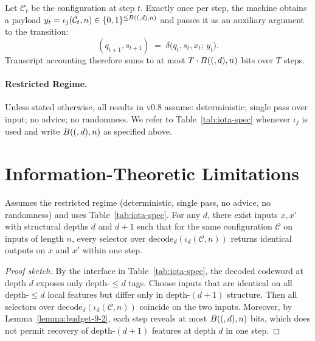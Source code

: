   \begin{definition}\label{def:iota-injection}
  Let $\mathcal{C}_t$ be the configuration at step $t$. Exactly once per step, the machine obtains a payload $y_t = \iota_j(\mathcal{C}_t, n) \in \{0,1\}^{\le B((,d),n)}$ and passes it as an auxiliary argument to the transition:
  \[
  (q_{t+1}, s_{t+1}) \;=\; \delta\bigl(q_t, s_t, x_t;\, y_t\bigr).
  \]
  Transcript accounting therefore sums to at most $T \cdot B((,d),n)$ bits over $T$ steps.
  \end{definition}
  
  
  \paragraph{Restricted Regime.}
  Unless stated otherwise, all results in v0.8 assume: deterministic; single pass over input; no advice; no randomness.
  We refer to Table~\ref{tab:iota-spec} whenever $\iota_j$ is used and write $B((,d),n)$ as specified above.
  
  \section{Information-Theoretic Limitations}
  
  \begin{lemma}
  \label{lemma:selector-indist}
  Assumes the restricted regime (deterministic, single pass, no advice, no randomness) and uses Table~\ref{tab:iota-spec}.
  For any $d$, there exist inputs $x,x'$ with structural depths $d$ and $d{+}1$ such that for the same configuration $\mathcal{C}$ on inputs of length $n$, every selector over $\mathrm{decode}_d(\iota_d(\mathcal{C},n))$ returns identical outputs on $x$ and $x'$ within one step.
  \end{lemma}

  \begin{proof}[Proof sketch]
  By the interface in Table~\ref{tab:iota-spec}, the decoded codeword at depth $d$ exposes only depth-$\le d$ tags. Choose inputs that are identical on all depth-$\le d$ local features but differ only in depth-$(d{+}1)$ structure. Then all selectors over $\mathrm{decode}_d(\iota_d(\mathcal{C},n))$ coincide on the two inputs. Moreover, by Lemma~\ref{lemma:budget-9-2}, each step reveals at most $B((,d),n)$ bits, which does not permit recovery of depth-$(d{+}1)$ features at depth $d$ in one step.
  \end{proof}
  
